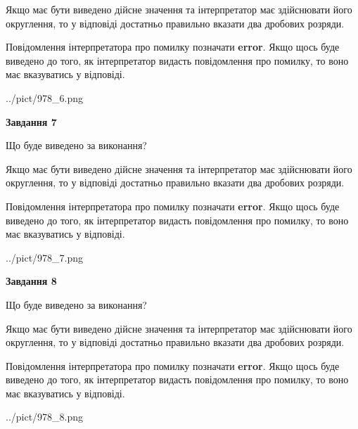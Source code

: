 \documentclass[12pt, ukrainian]{article}
\begin{document}
{\begin {Large}
Якщо має бути виведено дійсне значення та інтерпретатор має здійснювати його округлення, 
то у відповіді достатньо правильно вказати два дробових розряди.

Повідомлення інтерпретатора про помилку позначати \textbf{error}.
Якщо щось буде виведено до того, як інтерпретатор видасть повідомлення про помилку, 
то воно має вказуватись у відповіді. \par

\begin{center}
	{../pict/978_6.png}
\end{center}
\newpage

{\begin {center}\textbf{Завдання 7}\end {center}}\par
Що буде виведено за виконання? \par

Якщо має бути виведено дійсне значення та інтерпретатор має здійснювати його округлення, 
то у відповіді достатньо правильно вказати два дробових розряди.

Повідомлення інтерпретатора про помилку позначати \textbf{error}.
Якщо щось буде виведено до того, як інтерпретатор видасть повідомлення про помилку, 
то воно має вказуватись у відповіді. \par

\begin{center}
	{../pict/978_7.png}
\end{center}
\newpage

{\begin {center}\textbf{Завдання 8}\end {center}}\par
Що буде виведено за виконання? \par

Якщо має бути виведено дійсне значення та інтерпретатор має здійснювати його округлення, 
то у відповіді достатньо правильно вказати два дробових розряди.

Повідомлення інтерпретатора про помилку позначати \textbf{error}.
Якщо щось буде виведено до того, як інтерпретатор видасть повідомлення про помилку, 
то воно має вказуватись у відповіді. \par

\begin{center}
	{../pict/978_8.png}
\end{center}
\newpage


\end{Large}}
\end{document}
